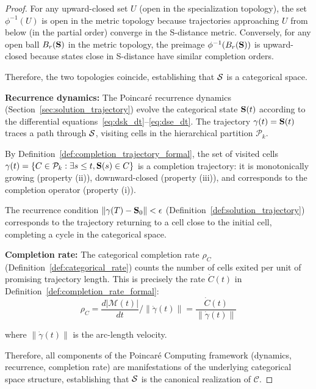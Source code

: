\begin{proof}
For any upward-closed set $U$ (open in the specialization topology), the set $\phi^{-1}(U)$ is open in the metric topology because trajectories approaching $U$ from below (in the partial order) converge in the S-distance metric. Conversely, for any open ball $B_r(\mathbf{S})$ in the metric topology, the preimage $\phi^{-1}(B_r(\mathbf{S}))$ is upward-closed because states close in S-distance have similar completion orders.

Therefore, the two topologies coincide, establishing that $\mathcal{S}$ is a categorical space.

\textbf{Recurrence dynamics:} The Poincaré recurrence dynamics (Section~\ref{sec:solution_trajectory}) evolve the categorical state $\mathbf{S}(t)$ according to the differential equations~\eqref{eq:dsk_dt}--\eqref{eq:dse_dt}. The trajectory $\gamma(t) = \mathbf{S}(t)$ traces a path through $\mathcal{S}$, visiting cells in the hierarchical partition $\mathcal{P}_k$.

By Definition~\ref{def:completion_trajectory_formal}, the set of visited cells $\gamma(t) = \{C \in \mathcal{P}_k : \exists s \leq t, \mathbf{S}(s) \in C\}$ is a completion trajectory: it is monotonically growing (property (ii)), downward-closed (property (iii)), and corresponds to the completion operator (property (i)).

The recurrence condition $\|\gamma(T) - \mathbf{S}_0\| < \epsilon$ (Definition~\ref{def:solution_trajectory}) corresponds to the trajectory returning to a cell close to the initial cell, completing a cycle in the categorical space.

\textbf{Completion rate:} The categorical completion rate $\rho_C$ (Definition~\ref{def:categorical_rate}) counts the number of cells exited per unit of promising trajectory length. This is precisely the rate $\dot{C}(t)$ in Definition~\ref{def:completion_rate_formal}:
\begin{equation}
\rho_C = \frac{d|\mathcal{M}(t)|}{dt} / \|\dot{\gamma}(t)\| = \frac{\dot{C}(t)}{\|\dot{\gamma}(t)\|}
\end{equation}

where $\|\dot{\gamma}(t)\|$ is the arc-length velocity.

Therefore, all components of the Poincaré Computing framework (dynamics, recurrence, completion rate) are manifestations of the underlying categorical space structure, establishing that $\mathcal{S}$ is the canonical realization of $\mathcal{C}$.
\end{proof}


